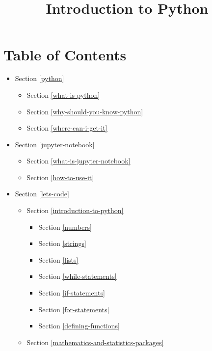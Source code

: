 \documentclass[11pt]{article}
\title{Introduction to Python}
\providecommand{\tightlist}{%
      \setlength{\itemsep}{0pt}\setlength{\parskip}{0pt}}
\begin{document}
    
    
    \maketitle
    
    

    
    \hypertarget{table-of-contents}{%
\section{Table of Contents}\label{table-of-contents}}

\begin{itemize}
\item
  Section \ref{python}

  \begin{itemize}
  \tightlist
  \item
    Section \ref{what-is-python}
  \item
    Section \ref{why-should-you-know-python}
  \item
    Section \ref{where-can-i-get-it}
  \end{itemize}
\item
  Section \ref{jupyter-notebook}

  \begin{itemize}
  \tightlist
  \item
    Section \ref{what-is-jupyter-notebook}
  \item
    Section \ref{how-to-use-it}
  \end{itemize}
\item
  Section \ref{lets-code}

  \begin{itemize}
  \tightlist
  \item
    Section \ref{introduction-to-python}

    \begin{itemize}
    \tightlist
    \item
      Section \ref{numbers}
    \item
      Section \ref{strings}
    \item
      Section \ref{lists}
    \item
      Section \ref{while-statements}
    \item
      Section \ref{if-statements}
    \item
      Section \ref{for-statements}
    \item
      Section \ref{defining-functions}
    \end{itemize}
  \item
    Section \ref{mathematics-and-statistics-packages}


\end{itemize}
\end{itemize}
\end{document}
